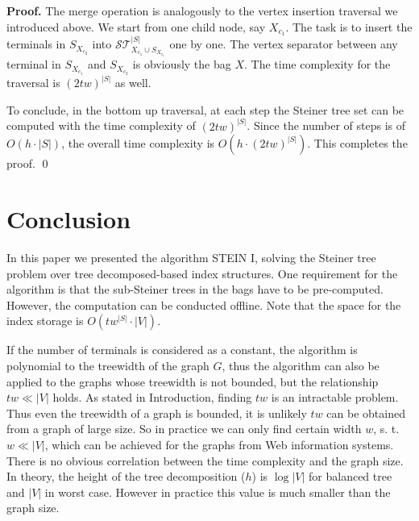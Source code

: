 \documentclass[preprint,12pt]{elsarticle}
\newenvironment{proof}{\begin{trivlist}\item[]\textbf{Proof.}}{\end{trivlist}}
\newcommand{\stset}{\mathcal{ST}}
\begin{document}
\begin{proof}
The merge operation is analogously to the vertex insertion traversal we introduced above.
We start from one child node, say $X_{c_1}$. The task is to insert the terminals 
in $S_{X_{c_2}}$ into $\stset_{X_{c_1} \cup S_{X_{c_1}}}^{|S|}$ one by one.
The vertex separator between any terminal in $S_{X_{c_1}}$ and $S_{X_{c_2}}$
is obviously the bag $X$.
The time complexity for the traversal is  $(2tw)^{|S|}$ as well.

To conclude, in the bottom up traversal, at each step the Steiner tree set can be computed
with the time complexity of $(2tw)^{|S|}$. 
Since the number of steps is of $O(h \cdot |S|)$,
the overall time complexity 
is $O(h \cdot (2tw)^{|S|})$. This completes the proof. \qed
\end{proof}


\section{Conclusion}

In this paper we presented the algorithm STEIN I, solving the Steiner tree problem over tree decomposed-based index structures.
One requirement for the algorithm is that the sub-Steiner trees in the bags have to be pre-computed. 
However, the computation can be conducted offline. Note that the space for the index storage is $O(tw^{|S|} \cdot |V|)$. 

If the number of terminals is considered as a constant, the algorithm is polynomial to the treewidth of the graph $G$,
thus the algorithm can also be applied to the graphs whose treewidth is not bounded, but the relationship $tw \ll |V|$ holds.
As stated in Introduction, finding $tw$ is an intractable problem. Thus even the treewidth of a graph is bounded, 
it is unlikely $tw$ can be obtained from a graph of large size. So in practice we can only find certain width $w$, s. t. $w \ll |V|$,
which can be achieved for the graphs from Web information systems.
There is no obvious correlation between the time complexity and the graph size. In theory, the height of the  tree decomposition ($h$)
is $\log |V|$ for balanced tree and $|V|$ in worst case. However in practice this value is much smaller than the graph size.



\end{document}
